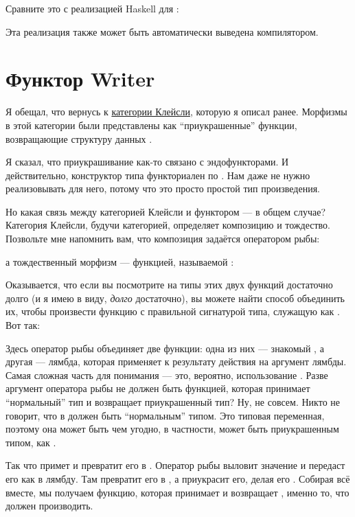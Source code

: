 Сравните это с реализацией Haskell для :

Эта реализация также может быть автоматически выведена компилятором.

\section{Функтор Writer}

Я обещал, что вернусь к \hyperref[kleisli-categories]{категории Клейсли},
которую я описал ранее. Морфизмы в этой категории были
представлены как ``приукрашенные'' функции, возвращающие структуру данных .

Я сказал, что приукрашивание как-то связано с эндофункторами. И
действительно, конструктор типа  функториален по
. Нам даже не нужно реализовывать  для него,
потому что это просто простой тип произведения.

Но какая связь между категорией Клейсли и функтором --- в
общем случае? Категория Клейсли, будучи категорией, определяет композицию и
тождество. Позвольте мне напомнить вам, что композиция задаётся оператором рыбы:

а тождественный морфизм --- функцией, называемой :

Оказывается, что если вы посмотрите на типы этих двух функций достаточно
долго (и я имею в виду, \emph{долго} достаточно), вы можете найти способ объединить
их, чтобы произвести функцию с правильной сигнатурой типа, служащую как
. Вот так:

Здесь оператор рыбы объединяет две функции: одна из них ---
знакомый , а другая --- лямбда, которая применяет
 к результату действия  на аргумент лямбды.
Самая сложная часть для понимания --- это, вероятно, использование
. Разве аргумент оператора рыбы не должен быть
функцией, которая принимает ``нормальный'' тип и возвращает приукрашенный тип?
Ну, не совсем. Никто не говорит, что  в
 должен быть ``нормальным'' типом. Это
типовая переменная, поэтому она может быть чем угодно, в частности, может быть приукрашенным
типом, как .

Так что  примет  и превратит его в
. Оператор рыбы выловит значение
 и передаст его как  в лямбду. Там 
превратит его в , а  приукрасит его,
делая его . Собирая всё вместе, мы получаем
функцию, которая принимает  и возвращает ,
именно то, что  должен производить.

